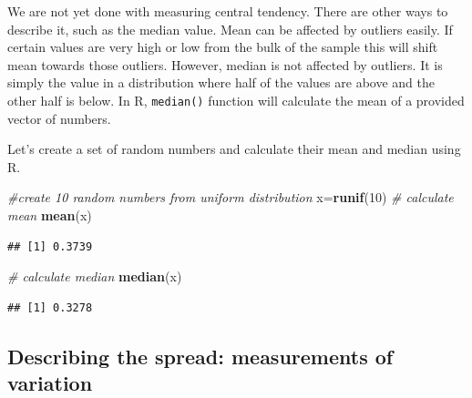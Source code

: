 \documentclass[12pt,]{krantz}
\newenvironment{Shaded}{\begin{snugshade}}{\end{snugshade}}
\newcommand{\CommentTok}[1]{\textcolor[rgb]{0.56,0.35,0.01}{\textit{#1}}}
\newcommand{\DecValTok}[1]{\textcolor[rgb]{0.00,0.00,0.81}{#1}}
\newcommand{\KeywordTok}[1]{\textcolor[rgb]{0.13,0.29,0.53}{\textbf{#1}}}
\newcommand{\NormalTok}[1]{#1}
\begin{document}
We are not yet done with measuring central tendency.
There are other ways to describe it, such as the median value.
Mean can be affected by outliers easily.
If certain values are very high or low from the
bulk of the sample this will shift mean towards those outliers. However, median
is not affected by outliers. It is simply the value in a distribution where half
of the values are above and the other half is below. In R, \texttt{median()} function
will calculate the mean of a provided vector of numbers.

Let's create a set of random numbers and calculate their mean and median using
R.

\begin{Shaded}
\begin{Highlighting}[]
\CommentTok{#create 10 random numbers from uniform distribution }
\NormalTok{x=}\KeywordTok{runif}\NormalTok{(}\DecValTok{10}\NormalTok{)}
\CommentTok{# calculate mean}
\KeywordTok{mean}\NormalTok{(x)}
\end{Highlighting}
\end{Shaded}

\begin{verbatim}
## [1] 0.3739
\end{verbatim}

\begin{Shaded}
\begin{Highlighting}[]
\CommentTok{# calculate median}
\KeywordTok{median}\NormalTok{(x)}
\end{Highlighting}
\end{Shaded}

\begin{verbatim}
## [1] 0.3278
\end{verbatim}

\hypertarget{describing-the-spread-measurements-of-variation}{%
\subsection{Describing the spread: measurements of variation}\label{describing-the-spread-measurements-of-variation}}
\end{document}
